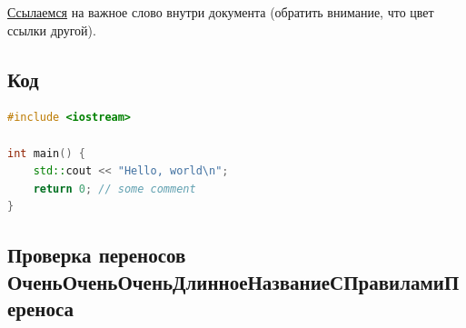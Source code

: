 \hyperlink{link-to-word}{Ссылаемся} на важное слово внутри документа (обратить внимание, что цвет ссылки другой).

\subsection{Код}

\begin{lstlisting}[language=C++]
#include <iostream>

int main() {
    std::cout << "Hello, world\n";
    return 0; // some comment
}
\end{lstlisting}

\subsection{Проверка переносов ОченьОченьОченьДлинноеНазваниеСПравиламиПереноса}
